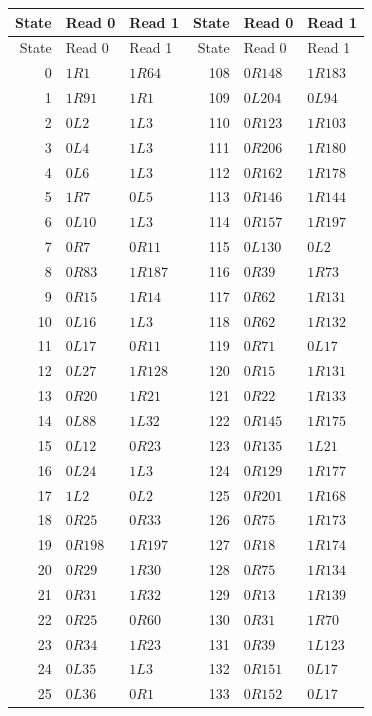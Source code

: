 \small\renewcommand{\arraystretch}{0.94}
\begin{longtable}{rll@{\qquad}rll}
\toprule State & Read 0 & Read 1 & State & Read 0 & Read 1\\\midrule
\endfirsthead
\toprule State & Read 0 & Read 1 & State & Read 0 & Read 1\\\midrule
\endhead
0 & $1R1$ & $1R64$ & 108 & $0R148$ & $1R183$\\
1 & $1R91$ & $1R1$ & 109 & $0L204$ & $0L94$\\
2 & $0L2$ & $1L3$ & 110 & $0R123$ & $1R103$\\
3 & $0L4$ & $1L3$ & 111 & $0R206$ & $1R180$\\
4 & $0L6$ & $1L3$ & 112 & $0R162$ & $1R178$\\
5 & $1R7$ & $0L5$ & 113 & $0R146$ & $1R144$\\
6 & $0L10$ & $1L3$ & 114 & $0R157$ & $1R197$\\
7 & $0R7$ & $0R11$ & 115 & $0L130$ & $0L2$\\
8 & $0R83$ & $1R187$ & 116 & $0R39$ & $1R73$\\
9 & $0R15$ & $1R14$ & 117 & $0R62$ & $1R131$\\
10 & $0L16$ & $1L3$ & 118 & $0R62$ & $1R132$\\
11 & $0L17$ & $0R11$ & 119 & $0R71$ & $0L17$\\
12 & $0L27$ & $1R128$ & 120 & $0R15$ & $1R131$\\
13 & $0R20$ & $1R21$ & 121 & $0R22$ & $1R133$\\
14 & $0L88$ & $1L32$ & 122 & $0R145$ & $1R175$\\
15 & $0L12$ & $0R23$ & 123 & $0R135$ & $1L21$\\
16 & $0L24$ & $1L3$ & 124 & $0R129$ & $1R177$\\
17 & $1L2$ & $0L2$ & 125 & $0R201$ & $1R168$\\
18 & $0R25$ & $0R33$ & 126 & $0R75$ & $1R173$\\
19 & $0R198$ & $1R197$ & 127 & $0R18$ & $1R174$\\
20 & $0R29$ & $1R30$ & 128 & $0R75$ & $1R134$\\
21 & $0R31$ & $1R32$ & 129 & $0R13$ & $1R139$\\
22 & $0R25$ & $0R60$ & 130 & $0R31$ & $1R70$\\
23 & $0R34$ & $1R23$ & 131 & $0R39$ & $1L123$\\
24 & $0L35$ & $1L3$ & 132 & $0R151$ & $0L17$\\
25 & $0L36$ & $0R1$ & 133 & $0R152$ & $0L17$\\

\end{longtable}
